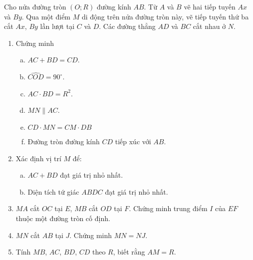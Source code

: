 \begin{bt}%
	Cho nửa đường tròn $(O;R)$ đường kính $AB$. Từ $A$ và $B$ vẽ hai tiếp tuyến $Ax$ và $By$. Qua một điểm $M$ di động trên nửa đường tròn này, vẽ tiếp tuyến thứ ba cắt $Ax$, $By$ lần lượt tại $C$ và $D$. Các đường thẳng $AD$ và $BC$ cắt nhau ở $N$.
	\begin{enumerate}[1)]
		\item Chứng minh
		\begin{enumerate}[a)]
			\item $AC+BD=CD$.
			\item $\widehat{COD}=90^\circ$.
			\item $AC \cdot BD=R^2$.
			\item $MN \parallel AC$.
			\item $CD \cdot MN=CM \cdot DB$
			\item Đường tròn đường kính $CD$ tiếp xúc với $AB$.
		\end{enumerate}
		\item Xác định vị trí $M$ để:
		\begin{enumerate}[a)]
			\item $AC+BD$ đạt giá trị nhỏ nhất.
			\item Diện tích tứ giác $ABDC$ đạt giá trị nhỏ nhất.
		\end{enumerate}
		\item $MA$ cắt $OC$ tại $E$, $MB$ cắt $OD$ tại $F$. Chứng minh trung điểm $I$ của $EF$ thuộc một đường tròn cố định.
		\item $MN$ cắt $AB$ tại $J$. Chứng minh $MN=NJ$.
		\item Tính $MB$, $AC$, $BD$, $CD$ theo $R$, biết rằng $AM=R$.
	\end{enumerate}
\end{bt}

